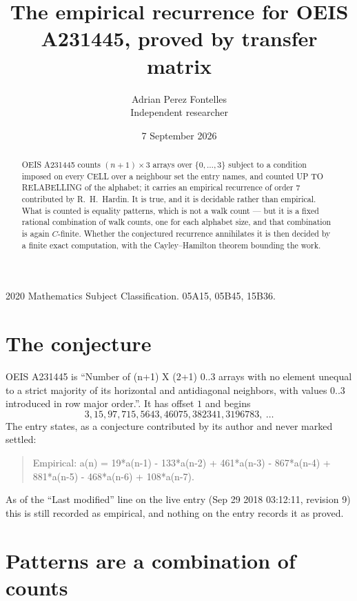 \documentclass[11pt,a4paper]{article}
\title{The empirical recurrence for OEIS A231445, proved by transfer matrix}
\author{Adrian Perez Fontelles\\ \small Independent researcher}
\date{7 September 2026}
\theoremstyle{plain}
\theoremstyle{definition}
\begin{document}
\maketitle

\begin{abstract}
OEIS A231445 counts $(n+1)\times3$ arrays over $\{0,\dots,3\}$ subject to a condition imposed on
every CELL over a neighbour set the entry names, and counted UP TO RELABELLING of the
alphabet; it carries an empirical recurrence of order $7$ contributed by
R.~H.~Hardin. It is true, and it is decidable rather than empirical. What is counted is
equality patterns, which is not a walk count --- but it is a fixed rational combination of
walk counts, one for each alphabet size, and that combination is again $C$-finite. Whether the
conjectured recurrence annihilates it is then decided by a finite exact computation, with the
Cayley--Hamilton theorem bounding the work.
\end{abstract}

\noindent\small 2020 Mathematics Subject Classification. 05A15, 05B45, 15B36.\normalsize

\section{The conjecture}

OEIS A231445 is ``Number of (n+1) X (2+1) 0..3 arrays with no element unequal to a strict majority of its horizontal and antidiagonal neighbors, with values 0..3 introduced in row major order.''. It has offset $1$ and begins
\[
3, 15, 97, 715, 5643, 46075, 382341, 3196783,\ \dots
\]
The entry states, as a conjecture contributed by its author and never marked settled:
\begin{quote}
Empirical: a(n) = 19*a(n-1) - 133*a(n-2) + 461*a(n-3) - 867*a(n-4) + 881*a(n-5) - 468*a(n-6) + 108*a(n-7).
\end{quote}
As of the ``Last modified'' line on the live entry (Sep 29 2018 03:12:11, revision 9) this is still
recorded as empirical, and nothing on the entry records it as proved.

\section{Patterns are a combination of counts}
\end{document}
